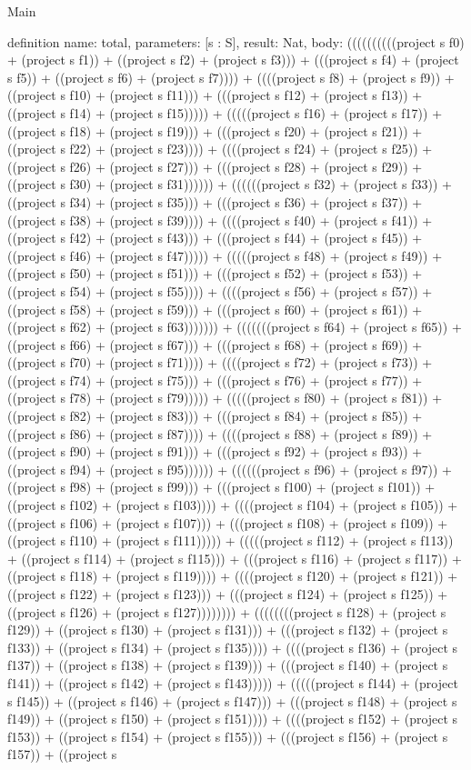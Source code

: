 \begin{lexlean}{Main}
\begin{semanticmodule}
definition{
  name: total,
  parameters: [s : S],
  result: Nat,
  body: ((((((((((project s f0) + (project s f1)) + ((project s f2) + (project s f3))) + (((project s f4) + (project s f5)) + ((project s f6) + (project s f7)))) + ((((project s f8) + (project s f9)) + ((project s f10) + (project s f11))) + (((project s f12) + (project s f13)) + ((project s f14) + (project s f15))))) + (((((project s f16) + (project s f17)) + ((project s f18) + (project s f19))) + (((project s f20) + (project s f21)) + ((project s f22) + (project s f23)))) + ((((project s f24) + (project s f25)) + ((project s f26) + (project s f27))) + (((project s f28) + (project s f29)) + ((project s f30) + (project s f31)))))) + ((((((project s f32) + (project s f33)) + ((project s f34) + (project s f35))) + (((project s f36) + (project s f37)) + ((project s f38) + (project s f39)))) + ((((project s f40) + (project s f41)) + ((project s f42) + (project s f43))) + (((project s f44) + (project s f45)) + ((project s f46) + (project s f47))))) + (((((project s f48) + (project s f49)) + ((project s f50) + (project s f51))) + (((project s f52) + (project s f53)) + ((project s f54) + (project s f55)))) + ((((project s f56) + (project s f57)) + ((project s f58) + (project s f59))) + (((project s f60) + (project s f61)) + ((project s f62) + (project s f63))))))) + (((((((project s f64) + (project s f65)) + ((project s f66) + (project s f67))) + (((project s f68) + (project s f69)) + ((project s f70) + (project s f71)))) + ((((project s f72) + (project s f73)) + ((project s f74) + (project s f75))) + (((project s f76) + (project s f77)) + ((project s f78) + (project s f79))))) + (((((project s f80) + (project s f81)) + ((project s f82) + (project s f83))) + (((project s f84) + (project s f85)) + ((project s f86) + (project s f87)))) + ((((project s f88) + (project s f89)) + ((project s f90) + (project s f91))) + (((project s f92) + (project s f93)) + ((project s f94) + (project s f95)))))) + ((((((project s f96) + (project s f97)) + ((project s f98) + (project s f99))) + (((project s f100) + (project s f101)) + ((project s f102) + (project s f103)))) + ((((project s f104) + (project s f105)) + ((project s f106) + (project s f107))) + (((project s f108) + (project s f109)) + ((project s f110) + (project s f111))))) + (((((project s f112) + (project s f113)) + ((project s f114) + (project s f115))) + (((project s f116) + (project s f117)) + ((project s f118) + (project s f119)))) + ((((project s f120) + (project s f121)) + ((project s f122) + (project s f123))) + (((project s f124) + (project s f125)) + ((project s f126) + (project s f127)))))))) + ((((((((project s f128) + (project s f129)) + ((project s f130) + (project s f131))) + (((project s f132) + (project s f133)) + ((project s f134) + (project s f135)))) + ((((project s f136) + (project s f137)) + ((project s f138) + (project s f139))) + (((project s f140) + (project s f141)) + ((project s f142) + (project s f143))))) + (((((project s f144) + (project s f145)) + ((project s f146) + (project s f147))) + (((project s f148) + (project s f149)) + ((project s f150) + (project s f151)))) + ((((project s f152) + (project s f153)) + ((project s f154) + (project s f155))) + (((project s f156) + (project s f157)) + ((project s }
\end{semanticmodule}
\end{lexlean}
